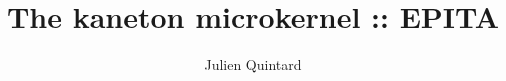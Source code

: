%
%
%
%
%
%

%
%

\def\path{../..}

%
%

%
%



%
%


%
%

\title{The kaneton microkernel :: EPITA}

%
%

\author{\small{Julien Quintard}}

%
%



%
%

\maketitle

%
%

